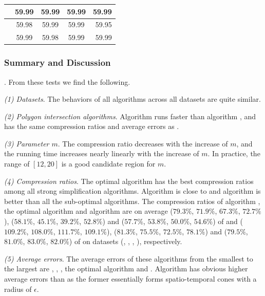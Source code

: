 {\begin{table}[bt!]
\begin{tabular}{|l|c|c|c|r|}
		\hline
		\cist	&59.99	    &59.99	        &59.99      &59.99 \\
		\hline
		\cista	&59.98	    &59.99	        &59.99      &59.95 \\
		\hline
		\squishe &59.99	    &59.98	        &59.99      &59.99 \\
		\hline
	\end{tabular}
	\label{tab:query-me}
	\vspace{-2ex}
\end{table}


\subsubsection{Summary and Discussion}
. From these tests we find the following.

\sstab \emph{(1) Datasets}. The behaviors of all algorithms across all datasets are quite similar.

\sstab \emph{(2) Polygon intersection algorithms}. Algorithm \rpia runs faster than  algorithm \cpia, and has the same compression ratios and average errors as \cpia.

\sstab\emph{(3) Parameter $m$}. The compression ratio decreases with the increase of $m$, and the running time increases nearly linearly with the increase of $m$. In practice, the range of $[12, 20]$ is a good candidate region for $m$.

\sstab\emph{(4) Compression ratios}. The optimal \lsa algorithm has the best compression ratios among all strong simplification algorithms. Algorithm \cist is close to \dps and algorithm \cista is better than all the sub-optimal \lsa algorithms.
The compression ratios of algorithm \cist, the optimal algorithm and algorithm \cista are on average
($79.3\%$, $71.9\%$, $67.3\%$, $72.7\%$),
{($58.1\%$, $45.1\%$, $39.2\%$, $52.8\%$)} and ($57.7\%$, $53.8\%$, $50.0\%$, $54.6\%$) of \squishe
and ($109.2\%$, $108.0\%$, $111.7\%$, $109.1\%$), {($81.3\%$, $75.5\%$, $72.5\%$, $78.1\%$)} and ($79.5\%$, $81.0\%$, $83.0\%$, $82.0\%$) of \dps on {datasets} (\sercar, \geolife, \mopsi, \pricar), respectively.

\sstab\emph{(5) Average errors}. The average errors of these algorithms from the smallest to the largest are \squishe, \dps, \cist, the optimal \lsa algorithm and \cista. Algorithm \cista has obvious higher average errors than \cist as the former essentially forms spatio-temporal cones with a radius of $\epsilon$.

}
